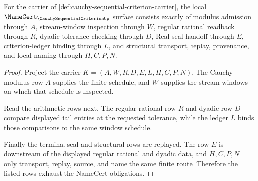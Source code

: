 \begin{theorem}
\label{thm:cauchy-sequential-criterion-window-obligations}
For the carrier of \autoref{def:cauchy-sequential-criterion-carrier}, the local $\NameCert_{\CauchySequentialCriterionUp}$ surface consists exactly of modulus admission through $A$, stream-window inspection through $W$, regular rational readback through $R$, dyadic tolerance checking through $D$, Real seal handoff through $E$, criterion-ledger binding through $L$, and structural transport, replay, provenance, and local naming through $H,C,P,N$.
\end{theorem}
\begin{proof}
Project the carrier $K=(A,W,R,D,E,L,H,C,P,N)$. The Cauchy-modulus row $A$ supplies the finite schedule, and $W$ supplies the stream windows on which that schedule is inspected.

Read the arithmetic rows next. The regular rational row $R$ and dyadic row $D$ compare displayed tail entries at the requested tolerance, while the ledger $L$ binds those comparisons to the same window schedule.

Finally the terminal seal and structural rows are replayed. The row $E$ is downstream of the displayed regular rational and dyadic data, and $H,C,P,N$ only transport, replay, source, and name the same finite route. Therefore the listed rows exhaust the NameCert obligations.
\end{proof}

